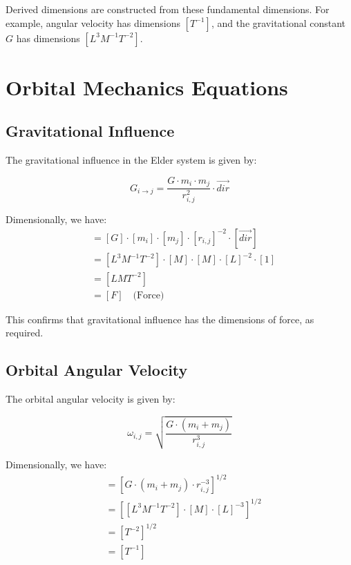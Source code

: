 Derived dimensions are constructed from these fundamental dimensions. For example, angular velocity has dimensions $[T^{-1}]$, and the gravitational constant $G$ has dimensions $[L^3 M^{-1} T^{-2}]$.

\section{Orbital Mechanics Equations}

\subsection{Gravitational Influence}

The gravitational influence in the Elder system is given by:

\begin{equation}
G_{i \rightarrow j} = \frac{G \cdot m_i \cdot m_j}{r_{i,j}^2} \cdot \vec{dir}
\end{equation}

Dimensionally, we have:
\begin{align}
[G_{i \rightarrow j}] &= [G] \cdot [m_i] \cdot [m_j] \cdot [r_{i,j}]^{-2} \cdot [\vec{dir}] \\
&= [L^3 M^{-1} T^{-2}] \cdot [M] \cdot [M] \cdot [L]^{-2} \cdot [1] \\
&= [L M T^{-2}] \\
&= [F] \quad \text{(Force)}
\end{align}

This confirms that gravitational influence has the dimensions of force, as required.

\subsection{Orbital Angular Velocity}

The orbital angular velocity is given by:

\begin{equation}
\omega_{i,j} = \sqrt{\frac{G \cdot (m_i + m_j)}{r_{i,j}^3}}
\end{equation}

Dimensionally, we have:
\begin{align}
[\omega_{i,j}] &= \left[G \cdot (m_i + m_j) \cdot r_{i,j}^{-3}\right]^{1/2} \\
&= \left[[L^3 M^{-1} T^{-2}] \cdot [M] \cdot [L]^{-3}\right]^{1/2} \\
&= \left[T^{-2}\right]^{1/2} \\
&= [T^{-1}]
\end{align}

